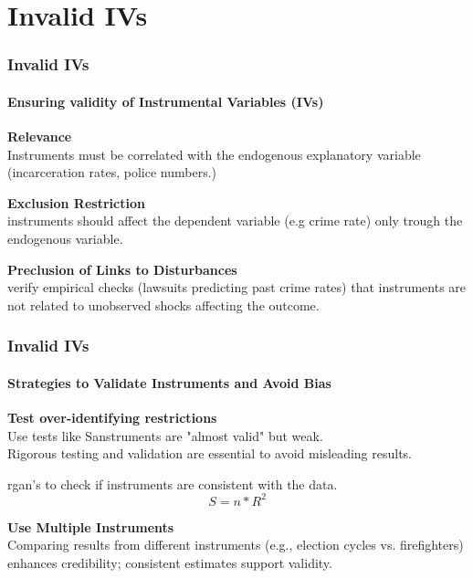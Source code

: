 \documentclass{beamer} %
\theoremstyle{definition}
\begin{document}
	\section{Invalid IVs}
	\begin{frame}[fragile]
		\frametitle{Invalid IVs}
		\framesubtitle{Ensuring validity of Instrumental Variables (IVs)}
		\textbf{Relevance}\\
		Instruments must be correlated with the endogenous explanatory variable (incarceration rates, police numbers.)
		
		\vspace{1em}
		\textbf{Exclusion Restriction}\\
		instruments should affect the dependent variable (e.g crime rate) only trough the endogenous variable.
		
		\vspace{1em}
		\textbf{Preclusion of Links to Disturbances}\\
		verify empirical checks (lawsuits predicting past crime rates) that instruments are not related to unobserved shocks affecting the outcome.
	\end{frame}
	
	\begin{frame}[fragile]
		\frametitle{Invalid IVs}
		\framesubtitle{Strategies to Validate Instruments and Avoid Bias}
		\textbf{Test over-identifying restrictions}\\
		Use tests like Sanstruments are "almost valid" but weak.\\
		\vspace{1em}	
		Rigorous testing and validation are essential to avoid misleading results. 
		\end{frame}rgan’s to check if instruments are consistent with the data.
		$$ S = n * R^2 $$
		
		\vspace{1em}
		\textbf{Use Multiple Instruments}\\
		Comparing results from different instruments (e.g., election cycles vs. firefighters) enhances credibility; consistent estimates support validity.
		
\end{document}
